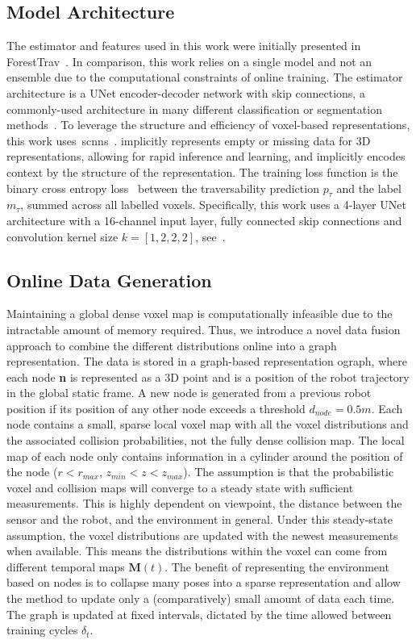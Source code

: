 \subsection{Model Architecture}
\label{subsec:model_def}
The estimator and features used in this work were initially presented in ForestTrav~\cite{ruetz2024foresttrav}. In comparison, this work relies on a single model and not an ensemble due to the computational constraints of online training. The estimator architecture is a UNet encoder-decoder network with skip connections, a commonly-used architecture in many different classification or segmentation methods~\cite{uzawa2022end}. To leverage the structure and efficiency of voxel-based representations, this work uses~\acp{scnn}~\cite{tang2022torchsparse}.  implicitly represents empty or missing data for 3D representations, allowing for rapid inference and learning, and implicitly encodes context by the structure of the representation. The training loss function is the binary cross entropy loss~\cite{good1952rational} between the traversability prediction $p_\tau$ and the label $m_\tau$, summed across all labelled voxels. Specifically, this work uses a 4-layer UNet architecture with a 16-channel input layer, fully connected skip connections and convolution kernel size $k=[1,2,2,2]$, see~\cite{ruetz2024foresttrav}.


\subsection{Online Data Generation}
\label{ch7:ograph}
Maintaining a global dense voxel map is computationally infeasible due to the intractable amount of memory required. Thus, we introduce a novel data fusion approach to combine the different distributions online into a graph representation. The data is stored in a graph-based representation \ac{ograph}, where each node \textbf{n} is represented as a 3D point and is a position of the robot trajectory in the global static frame. A new node is generated from a previous robot position if its position of any other node exceeds a threshold $d_{node} = 0.5m$. Each node contains a small, sparse local voxel map with all the voxel distributions and the associated collision probabilities, not the fully dense collision map.  The local map of each node only contains information in a cylinder around the position of the node ($r < r_{max}$, $z_{min} < z < z_{max}$). The assumption is that the probabilistic voxel and collision maps will converge to a steady state with sufficient measurements. This is highly dependent on viewpoint, the distance between the sensor and the robot, and the environment in general. Under this steady-state assumption, the voxel distributions are updated with the newest measurements when available. This means the distributions within the voxel can come from different temporal maps $\mathbf{M}(t)$. The benefit of representing the environment based on nodes is to collapse many poses into a sparse representation and allow the method to update only a (comparatively) small amount of data each time. The graph is updated at fixed intervals, dictated by the time allowed between training cycles $\delta_{t}$.

